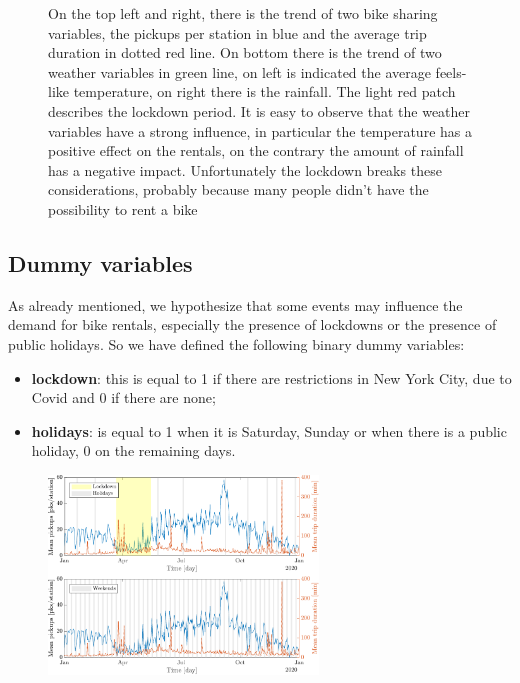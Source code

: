 \begin{figure}[h!]
	\quad
	\caption{On the top left and right, there is the trend of two bike sharing variables, the pickups per station in blue and the average trip duration in dotted red line. On bottom there is the trend of two weather variables in green line, on left is indicated the average feels-like temperature, on right there is the rainfall. The light red patch describes the lockdown period. It is easy to observe that the weather variables have a strong influence, in particular the temperature has a positive effect on the rentals, on the contrary the amount of rainfall has a negative impact. Unfortunately the lockdown breaks these considerations, probably because many people didn't have the possibility to rent a bike}
\end{figure}

\subsection{Dummy variables}
As already mentioned, we hypothesize that some events may influence the demand for bike rentals, especially the presence of lockdowns or the presence of public holidays. So we have defined the following binary dummy variables:
\begin{itemize}
	\item \textbf{lockdown}: this is equal to \num{1} if there are restrictions in New York City, due to Covid and \num{0} if there are none;
	\item \textbf{holidays}: is equal to \num{1} when it is Saturday, Sunday or when there is a public holiday, \num{0} on the remaining days.
\end{itemize}

\begin{figure}[h!]
	\centering
	\includegraphics[height = 200px]{Images/Dataset description/Chosen/Trend}
\end{figure}